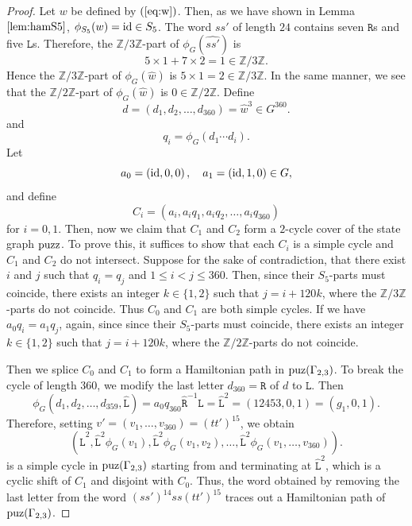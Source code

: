 \documentclass[lualatex,11pt]{article}
\begin{document}
\begin{proof}
 Let $w$ be defined by $(\ref{eq:w})$.
 Then, as we have shown in Lemma $\ref{lem:hamS5}$,
 $\phi_{S_5}(w)={\rm id}\in S_5$.
 The word $ss'$ of length $24$ contains seven ${\mathtt R}$s and 
 five ${\mathtt L}$s.
 Therefore, the ${\mathbb Z}/3{\mathbb Z}$-part
 of $\phi_G(\hat{ss'})$ is
 \[
  5\times 1 + 7\times 2 = 1\in {\mathbb Z}/3{\mathbb Z}.
 \]
 Hence the ${\mathbb Z}/3{\mathbb Z}$-part of
 $\phi_G(\hat{w})$ is $5\times{1}=2\in {\mathbb Z}/3{\mathbb Z}$.
 In the same manner, we see that
 the ${\mathbb Z}/2{\mathbb Z}$-part of
 $\phi_G(\hat{w})$ is $0\in {\mathbb Z}/2{\mathbb Z}$.
 Define 
 \[
  d=(d_1,d_2,\ldots,d_{360})=\hat{w}^3\in G^{360}.
 \]
 and
 \[
 q_i=\phi_G(d_1\cdots d_i).
 \]
 Let
 \[
 a_0 = \left({\rm id}, 0, 0\right), ~~~
 a_1 = \left({\rm id}, 1, 0\right)\in G,
 \]
 and define
 \[
  C_i = (a_i, a_iq_1, a_iq_2, \ldots, a_iq_{360})
 \]
 for $i=0,1$. Then, now we claim that $C_1$ and $C_2$ form
 a $2$-cycle cover of the state graph ${\rm puzz}$.
 To prove this, it suffices to show that each $C_i$ is
 a simple cycle and $C_1$ and $C_2$ do not intersect.
 Suppose for the sake of contradiction, 
 that there exist $i$ and $j$ such that 
 $q_i=q_j$ and $1\leq i < j\leq 360$.
 Then, since their $S_5$-parts must coincide,
 there exists an integer $k\in\{1,2\}$ such that $j=i+120k$,
 where the ${\mathbb Z}/3{\mathbb Z}$-parts do not
 coincide. Thus $C_0$ and $C_1$ are both simple cycles.
 If we have $a_0q_i=a_1q_j$, again, since 
 since their $S_5$-parts must coincide,
 there exists an integer $k\in\{1,2\}$ such that $j=i+120k$,
 where the ${\mathbb Z}/2{\mathbb Z}$-parts do not
 coincide.

 Then we splice $C_0$ and $C_1$ to form a Hamiltonian path
 in ${\rm puz}(\Gamma_{2,3})$.
 To break the cycle of length $360$,
 we modify the last letter $d_{360}={\mathtt R}$ of $d$ to ${\mathtt L}$.
 Then
 \[
  \phi_G(d_1,d_2,\ldots,d_{359},\hat{{\mathtt L}}) =
 a_0q_{360}\hat{\mathtt R}^{-1}\hat{{\mathtt L}}
 =
 \hat{{\mathtt L}}^2 
 =(12453,0,1) = (g_1, 0, 1).
 \]
 Therefore, setting $v'=(v_1,\ldots, v_{360})=(tt')^{15}$,
 we obtain
 \[
 (
 \hat{{\mathtt L}}^2,
 \hat{{\mathtt L}}^2\phi_G(v_1),
 \hat{{\mathtt L}}^2\phi_G(v_1,v_2),
 \ldots,
 \hat{{\mathtt L}}^2\phi_G(v_1,\ldots,v_{360})
 ).
 \]
 is a simple cycle in ${\rm puz}(\Gamma_{2,3})$
 starting from and terminating
 at $\hat{{\mathtt L}}^2$, which is a cyclic shift of $C_1$
 and disjoint with $C_0$.
 Thus, 
 the word obtained by removing the last letter from the word
 $(ss')^{14}ss(tt')^{15}$ traces out a Hamiltonian path
 of ${\rm puz}(\Gamma_{2,3})$.
\end{proof}
\end{document}
